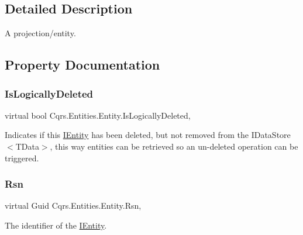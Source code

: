 \subsection{Detailed Description}
A projection/entity. 



\subsection{Property Documentation}
\mbox{\label{classCqrs_1_1Entities_1_1Entity_a0d7379f43369a62bfe5783005d3e6ceb_a0d7379f43369a62bfe5783005d3e6ceb}} 
\subsubsection{\texorpdfstring{Is\+Logically\+Deleted}{IsLogicallyDeleted}}
{\footnotesize\ttfamily virtual bool Cqrs.\+Entities.\+Entity.\+Is\+Logically\+Deleted\hspace{0.3cm}{\ttfamily [get]}, {\ttfamily [set]}}



Indicates if this \hyperlink{interfaceCqrs_1_1Entities_1_1IEntity}{I\+Entity} has been deleted, but not removed from the I\+Data\+Store$<$\+T\+Data$>$, this way entities can be retrieved so an un-\/deleted operation can be triggered. 

\mbox{\label{classCqrs_1_1Entities_1_1Entity_a5c7605c4ab598f2975b914db7a274796_a5c7605c4ab598f2975b914db7a274796}} 
\subsubsection{\texorpdfstring{Rsn}{Rsn}}
{\footnotesize\ttfamily virtual Guid Cqrs.\+Entities.\+Entity.\+Rsn\hspace{0.3cm}{\ttfamily [get]}, {\ttfamily [set]}}



The identifier of the \hyperlink{interfaceCqrs_1_1Entities_1_1IEntity}{I\+Entity}. 

